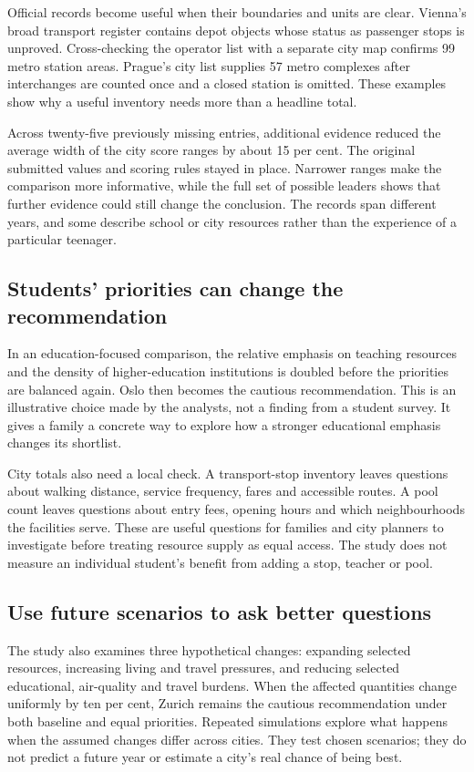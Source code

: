 Official records become useful when their boundaries and units are clear. Vienna's broad transport register contains depot objects whose status as passenger stops is unproved. Cross-checking the operator list with a separate city map confirms 99 metro station areas. Prague's city list supplies 57 metro complexes after interchanges are counted once and a closed station is omitted. These examples show why a useful inventory needs more than a headline total.

Across twenty-five previously missing entries, additional evidence reduced the average width of the city score ranges by about 15 per cent. The original submitted values and scoring rules stayed in place. Narrower ranges make the comparison more informative, while the full set of possible leaders shows that further evidence could still change the conclusion. The records span different years, and some describe school or city resources rather than the experience of a particular teenager.

\newpage
\subsection*{Students' priorities can change the recommendation}

In an education-focused comparison, the relative emphasis on teaching resources and the density of higher-education institutions is doubled before the priorities are balanced again. Oslo then becomes the cautious recommendation. This is an illustrative choice made by the analysts, not a finding from a student survey. It gives a family a concrete way to explore how a stronger educational emphasis changes its shortlist.

City totals also need a local check. A transport-stop inventory leaves questions about walking distance, service frequency, fares and accessible routes. A pool count leaves questions about entry fees, opening hours and which neighbourhoods the facilities serve. These are useful questions for families and city planners to investigate before treating resource supply as equal access. The study does not measure an individual student's benefit from adding a stop, teacher or pool.

\subsection*{Use future scenarios to ask better questions}

The study also examines three hypothetical changes: expanding selected resources, increasing living and travel pressures, and reducing selected educational, air-quality and travel burdens. When the affected quantities change uniformly by ten per cent, Zurich remains the cautious recommendation under both baseline and equal priorities. Repeated simulations explore what happens when the assumed changes differ across cities. They test chosen scenarios; they do not predict a future year or estimate a city's real chance of being best.

